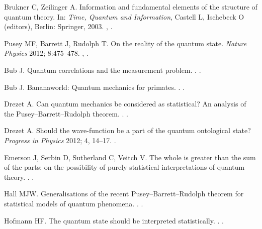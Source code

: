 \documentclass[DIV=calc,paper=a4,fontsize=11pt,twocolumn]{scrartcl} %
\theoremstyle{definition}
\theoremstyle{plain}
\begin{document}
\begin{thebibliography}{10}
Brukner C, Zeilinger A.
\newblock Information and fundamental elements of the structure of quantum theory.
\newblock In: \emph{Time, Quantum and Information}, Castell L, Ischebeck O (editors), Berlin: Springer, 2003.
\newblock \href {http://arxiv.org/abs/quant-ph/0212084}{},
\newblock \href {http://dx.doi.org/10.1007/978-3-662-10557-3_21}{}.

Pusey MF, Barrett J, Rudolph T.
\newblock On the reality of the quantum state.
\newblock \emph{Nature Physics} 2012; 8:475--478.
\newblock \href {http://arxiv.org/abs/1111.3328} {},
\href {http://dx.doi.org/10.1038/nphys2309} {}.

Bub J.
\newblock Quantum correlations and the measurement problem.
.
\newblock \href {http://arxiv.org/abs/1210.6371}
{}.

Bub J.
\newblock Bananaworld: Quantum mechanics for primates.
.
\newblock \href {http://arxiv.org/abs/1211.3062} {}.

Drezet A.
\newblock Can quantum mechanics be considered as statistical? An analysis of
the Pusey--Barrett--Rudolph theorem.
.
\newblock \href {http://arxiv.org/abs/1203.2475} {}.

Drezet A.
\newblock Should the wave-function be a part of the quantum ontological state?
\newblock \emph{Progress in Physics} 2012; 4, 14--17.
\newblock \href {http://arxiv.org/abs/1209.2565}{}.

Emerson J, Serbin D, Sutherland C, Veitch V.
\newblock The whole is greater than the sum of the parts: on the possibility of
purely statistical interpretations of quantum theory.
.
\newblock \href {http://arxiv.org/abs/1312.1345} {}.

Hall MJW.
\newblock Generalisations of the recent Pusey--Barrett--Rudolph theorem for
statistical models of quantum phenomena.
.
\newblock \href {http://arxiv.org/abs/1111.6304} {}.

Hofmann HF.
\newblock The quantum state should be interpreted statistically.
.
\newblock \href {http://arxiv.org/abs/1112.2446} {}.


\end{thebibliography}
\end{document}
